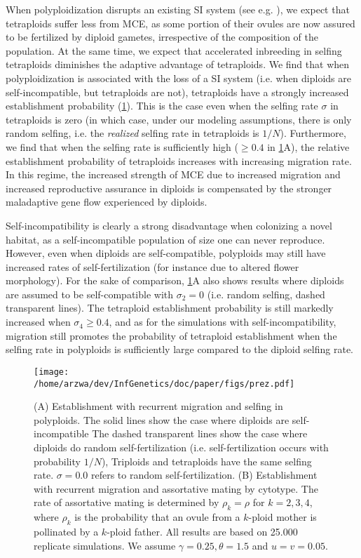 \documentclass[12pt,a4paper]{article}
\begin{document}
When polyploidization disrupts an existing SI system (see e.g.
\cite{robertson2011comparative,zenil2019,novikova2023}), we expect that
tetraploids suffer less from MCE, as some portion of their ovules are now
assured to be fertilized by diploid gametes, irrespective of the composition of
the population.
At the same time, we expect that accelerated inbreeding in selfing tetraploids
diminishes the adaptive advantage of tetraploids.
We find that when polyploidization is associated with the loss of a SI system
(i.e. when diploids are self-incompatible, but tetraploids are not),
tetraploids have a strongly increased establishment probability
(\cref{fig:selfing}).
This is the case even when the selfing rate $\sigma$ in tetraploids is zero (in
which case, under our modeling assumptions, there is only random selfing, i.e.
the \textit{realized} selfing rate in tetraploids is $1/N$).
Furthermore, we find that when the selfing rate is sufficiently high ($\ge 0.4$
in \cref{fig:selfing}A), the relative establishment probability of tetraploids
increases with increasing migration rate.
In this regime, the increased strength of MCE due to increased migration and
increased reproductive assurance in diploids is compensated by the stronger
maladaptive gene flow experienced by diploids.

Self-incompatibility is clearly a strong disadvantage when colonizing a novel
habitat, as a self-incompatible population of size one can never reproduce.
However, even when diploids are self-compatible, polyploids may still have
increased rates of self-fertilization (for instance due to altered flower
morphology).
For the sake of comparison, \cref{fig:selfing}A also shows results where
diploids are assumed to be self-compatible with $\sigma_2=0$ (i.e. random
selfing, dashed transparent lines).
The tetraploid establishment probability is still markedly increased when
$\sigma_4 \ge 0.4$, and as for the simulations with self-incompatibility,
migration still promotes the probability of tetraploid establishment when the
selfing rate in polyploids is sufficiently large compared to the diploid
selfing rate.

\begin{figure}
\centering
\texttt{[image: /home/arzwa/dev/InfGenetics/doc/paper/figs/prez.pdf]} 
    \caption{
    (A) Establishment with recurrent migration and selfing in polyploids. 
    The solid lines show the case where diploids are self-incompatible 
    The dashed transparent lines show the case where diploids do random
    self-fertilization (i.e. self-fertilization occurs with probability $1/N$),
    Triploids and tetraploids have the same selfing rate. 
    $\sigma=0.0$ refers to random self-fertilization.  
    (B) Establishment with recurrent migration and assortative mating by
    cytotype. The rate of assortative mating is determined by $\rho_k = \rho$
    for $k=2,3,4$, where $\rho_k$ is the probability that an ovule from a
    $k$-ploid mother is pollinated by a $k$-ploid father.
    All results are based on 25.000 replicate simulations.  We assume
    $\gamma=0.25, \theta=1.5$ and $u=v=0.05$.  \label{fig:selfing}}
\end{figure}
\end{document}
